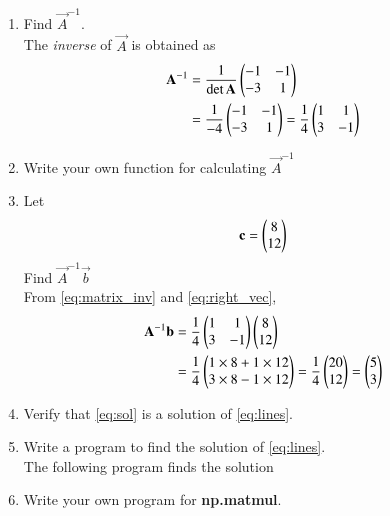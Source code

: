 \documentclass[journal,12pt,twocolumn]{IEEEtran}
\renewcommand\thesection{\arabic{section}}
\begin{document}
\begin{enumerate}[label=\thesection.\arabic*
,ref=\thesection.\theenumi]
\item Find $\vec{A}^{-1}$.
\\
\solution  The {\em inverse} of $\vec{A}$ is obtained as
\begin{align}
\label{eq:matrix_inv}
\mathbf{A}^{-1} &= \frac{1}{\det{\mathbf{A}}}\begin{pmatrix}-1 & -1 \\ -3 & 1\end{pmatrix}
\\
 &= \frac{1}{-4}\begin{pmatrix}-1 & -1 \\ -3 & 1\end{pmatrix}
 = \frac{1}{4}\begin{pmatrix}1 & 1 \\ 3 & -1\end{pmatrix}
\end{align}
%
\item Write your own function for calculating $\vec{A}^{-1}$
\item Let 
\begin{align}
\label{eq:right_vec}
\mathbf{c} = \begin{pmatrix}8 \\12\end{pmatrix}
\end{align}
Find $\vec{A}^{-1}\vec{b}$
\\
\solution From \eqref{eq:matrix_inv} and \eqref{eq:right_vec},%
\begin{align}
\mathbf{A}^{-1}\mathbf{b}&= \frac{1}{4}\begin{pmatrix}1 & 1 \\ 3 & -1\end{pmatrix}\begin{pmatrix}8 \\12\end{pmatrix}
\\
&= \frac{1}{4}\begin{pmatrix}1\times8+  1\times12 \\ 3\times8  -1\times12\end{pmatrix}=\frac{1}{4}\begin{pmatrix}20 \\12\end{pmatrix} = \begin{pmatrix}5 \\3\end{pmatrix}
\label{eq:sol}
\end{align}
\item Verify that \eqref{eq:sol} is a solution of \eqref{eq:lines}.
\item Write a program to find the solution of \eqref{eq:lines}.
\\
\solution The following program finds the solution 

\item Write your own program for \textbf{np.matmul}.

\end{enumerate}
\end{document}
